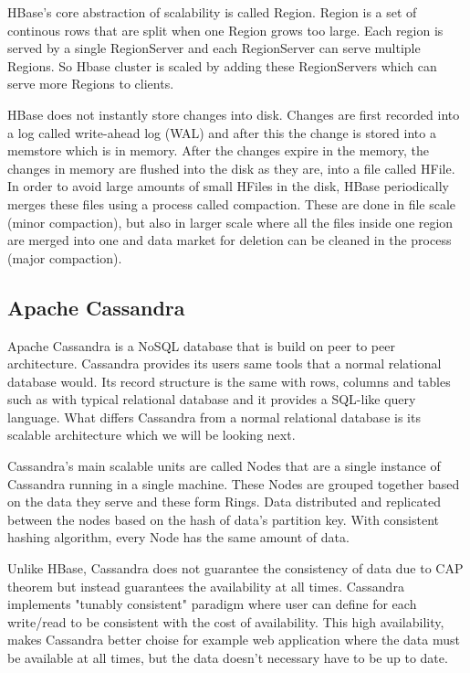 HBase's core abstraction of scalability is called Region.
Region is a set of continous rows that are split when one Region grows too large.
Each region is served by a single RegionServer and each RegionServer can serve multiple Regions.
So Hbase cluster is scaled by adding these RegionServers which can serve more Regions to clients. \cite{george}

HBase does not instantly store changes into disk. 
Changes are first recorded into a log called write-ahead log (WAL) and after this the change is stored into a memstore which is in memory.
After the changes expire in the memory, the changes in memory are flushed into the disk as they are, into a file called HFile. 
In order to avoid large amounts of small HFiles in the disk, HBase periodically merges these files using a process called compaction.
These are done in file scale (minor compaction), but also in larger scale where all the files inside one region are merged into one and data market for deletion can be cleaned in the process (major compaction). \cite{george}

\subsection{Apache Cassandra}

Apache Cassandra is a NoSQL database that is build on peer to peer architecture.
Cassandra provides its users same tools that a normal relational database would.
Its record structure is the same with rows, columns and tables such as with typical relational database and it provides a SQL-like query language.
What differs Cassandra from a normal relational database is its scalable architecture which we will be looking next. \cite{yarabarla}

Cassandra's main scalable units are called Nodes that are a single instance of Cassandra running in a single machine.
These Nodes are grouped together based on the data they serve and these form Rings.
Data distributed and replicated between the nodes based on the hash of data's partition key.
With consistent hashing algorithm, every Node has the same amount of data. \cite{neeraj}

Unlike HBase, Cassandra does not guarantee the consistency of data due to CAP theorem but instead guarantees the availability at all times.
Cassandra implements "tunably consistent" paradigm where user can define for each write/read to be consistent with the cost of availability.
This high availability, makes Cassandra better choise for example web application where the data must be available at all times, but the data doesn't necessary have to be up to date. \cite{neeraj}


